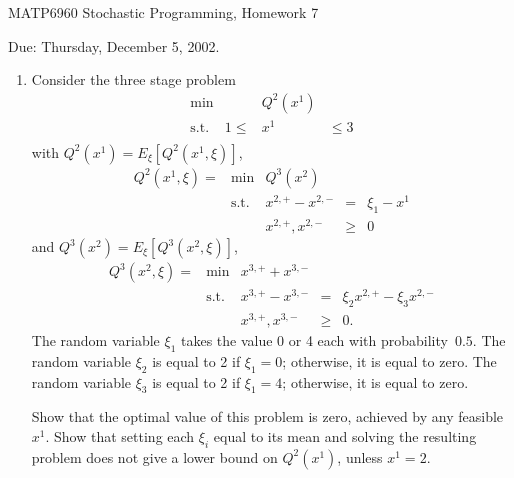 \documentclass[12pt]{article}
\begin{document}
\begin{center}
  \begin{large}
     MATP6960 Stochastic Programming, Homework 7
  \end{large}
\end{center}

\begin{flushright}
   Due:  Thursday, December 5, 2002.
\end{flushright}

\vspace{\baselineskip}


\begin{enumerate}
\item Consider the three stage problem
\begin{displaymath}
\begin{array}{lrcl}
\min && Q^2(x^1) \\
\mbox{s.t.} & 1  \leq & x^1 & \leq 3 \\
\end{array}
\end{displaymath}
with $Q^2(x^1)=E_{\xi}[Q^2(x^1,\xi)]$,
\begin{displaymath}
\begin{array}{rlrcl}
Q^2(x^1,\xi) = & \min & Q^3(x^2) \\
&\mbox{s.t.} & x^{2,+} - x^{2,-} & = & \xi_1 - x^1 \\
&& x^{2,+}, x^{2,-} & \geq & 0
\end{array}
\end{displaymath}
and $Q^3(x^2)=E_{\xi}[Q^3(x^2,\xi)]$,
\begin{displaymath}
\begin{array}{rlrcl}
Q^3(x^2,\xi) = & \min & x^{3,+} + x^{3,-} \\
&\mbox{s.t.} & x^{3,+} - x^{3,-} & = & \xi_2 x^{2,+} - \xi_3 x^{2,-} \\
&& x^{3,+}, x^{3,-} & \geq & 0.
\end{array}
\end{displaymath}
The random variable $\xi_1$ takes the value 0 or 4 each with probability~$0.5$.
The random variable $\xi_2$ is equal to 2 if $\xi_1=0$; otherwise, it is equal to zero.
The random variable $\xi_3$ is equal to 2 if $\xi_1=4$; otherwise, it is equal to zero.

Show that the optimal value of this problem is zero, achieved by any feasible~$x^1$.
Show that setting each $\xi_i$ equal to its mean and solving the resulting problem
does not give a lower bound on $Q^2(x^1)$, unless $x^1=2$.



\end{enumerate}
\end{document}
